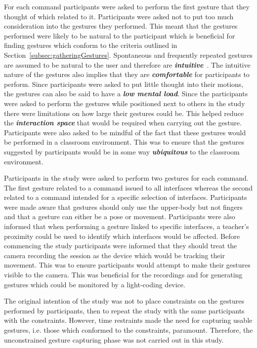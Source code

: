 \documentclass[link]{IWCOMP}
\begin{document}
For each command participants were asked to perform the first gesture that they thought of which related to it.
Participants were asked not to put too much consideration into the gestures they performed.
This meant that the gestures performed were likely to be natural to the participant which is beneficial for finding gestures which conform to the criteria outlined in Section~\ref{subsec:gatheringGestures}.
Spontaneous and frequently repeated gestures are assumed to be natural to the user and therefore are \textit{\textbf{intuitive}}~\cite{Grandhi2011}.
The intuitive nature of the gestures also implies that they are \textit{\textbf{comfortable}} for participants to perform.
Since participants were asked to put little thought into their motions, the gestures can also be said to have a \textit{\textbf{low mental load}}.
Since the participants were asked to perform the gestures while positioned next to others in the study there were limitations on how large their gestures could be.
This helped reduce the \textit{\textbf{interaction space}} that would be required when carrying out the gesture.
Participants were also asked to be mindful of the fact that these gestures would be performed in a classroom environment.
This was to ensure that the gestures suggested by participants would be in some way \textit{\textbf{ubiquitous}} to the classroom environment.

Participants in the study were asked to perform two gestures for each command.
The first gesture related to a command issued to all interfaces whereas the second related to a command intended for a specific selection of interfaces.
Participants were made aware that gestures should only use the upper-body but not fingers and that a gesture can either be a pose or movement.
Participants were also informed that when performing a gesture linked to specific interfaces, a teacher's proximity could be used to identify which interfaces would be affected.
Before commencing the study participants were informed that they should treat the camera recording the session as the device which would be tracking their movement.
This was to ensure participants would attempt to make their gestures visible to the camera.
This was beneficial for the recordings and for generating gestures which could be monitored by a light-coding device.

The original intention of the study was not to place constraints on the gestures performed by participants, then to repeat the study with the same participants with the constraints.
However, time restraints made the need for capturing usable gestures, i.e. those which conformed to the constraints, paramount.
Therefore, the unconstrained gesture capturing phase was not carried out in this study.
\end{document}
